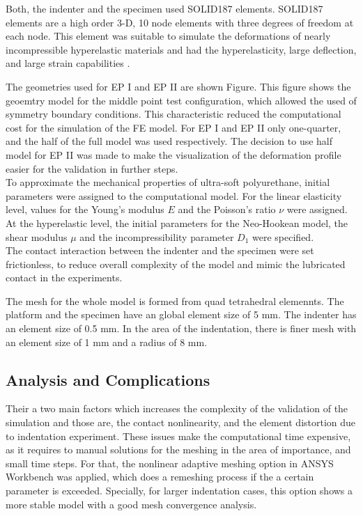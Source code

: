 Both, the indenter and the specimen used SOLID187 elements. 
SOLID187 elements are a high order 3-D, 10 node elements with three degrees of freedom at each node. 
This element was suitable to simulate the deformations of nearly incompressible hyperelastic materials 
and had the hyperelasticity, large deflection, and large strain capabilities \cite{Ansys2010}.

The geometries used for EP I and EP II are shown Figure. %
This figure shows the geoemtry model for the middle point test configuration, which allowed the used 
of symmetry boundary conditions. This characteristic reduced the computational cost for the simulation 
of the FE model. For EP I and EP II only one-quarter, and the half of the full model was used respectively.
The decision to use half model for EP II was made to make the visualization of the deformation profile 
easier for the validation in further steps.\\

To approximate the mechanical properties of ultra-soft polyurethane, initial parameters were assigned 
to the computational model. For the linear elasticity level, values for the Young's modulus $E$ and the 
Poisson's ratio $\nu$ were assigned. At the hyperelastic level, the initial parameters for the Neo-Hookean model, 
the shear modulus $\mu$ and the incompressibility parameter $D_1$ were specified.\\ 

The contact interaction between the indenter and the specimen were set frictionless, to reduce 
overall complexity of the model and mimic the lubricated contact in the experiments.


The mesh for the whole model is formed from quad tetrahedral elemennts. The platform and 
the specimen have an global element size of 5 mm. The indenter has an element size of
0.5 mm. In the area of the indentation, there is finer mesh with an element size of
1 mm and a radius of 8 mm. 

\subsection{Analysis and Complications}
Their a two main factors which increases the complexity of the validation of the simulation
and those are, the contact nonlinearity, and the element distortion due to indentation
 experiment. These issues make the computational time expensive, as it requires to manual 
 solutions for the meshing in the area of importance, and small time steps. 
 For that, 
 the nonlinear adaptive meshing option in ANSYS Workbench was applied, which does a remeshing
 process if the a certain parameter is exceeded.%
Specially, for larger indentation cases, this option shows a more stable model with a 
good mesh convergence analysis.

